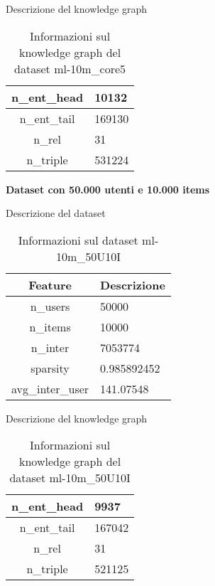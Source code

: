 \noindent Descrizione del knowledge graph
\begin{table}[H]
    \centering
    \footnotesize
    \begin{tabularx}{\textwidth}{|c|X|}
        \hline
        n\_ent\_head & 10132 \\
        \hline
        n\_ent\_tail & 169130 \\
        \hline
        n\_rel & 31 \\
        \hline
        n\_triple & 531224 \\
        \hline
    \end{tabularx}
    \caption{Informazioni sul knowledge graph del dataset ml-10m\_core5}
    \label{tab:dataset_info}
\end{table}



\noindent\textbf{Dataset con 50.000 utenti e 10.000 items}

\noindent Descrizione del dataset
\begin{table}[H]
    \centering
    \footnotesize
    \begin{tabularx}{\textwidth}{|c|X|}
        \hline
        \textbf{Feature} & \textbf{Descrizione} \\
        \hline
        n\_users & 50000 \\
        \hline
        n\_items & 10000 \\
        \hline
        n\_inter & 7053774 \\
        \hline
        sparsity & 0.985892452 \\
        \hline
        avg\_inter\_user & 141.07548 \\
        \hline
    \end{tabularx}
    \caption{Informazioni sul dataset ml-10m\_50U10I}
    \label{tab:dataset_info}
\end{table}


\noindent Descrizione del knowledge graph
\begin{table}[H]
    \centering
    \footnotesize
    \begin{tabularx}{\textwidth}{|c|X|}
        \hline
        n\_ent\_head & 9937 \\
        \hline
        n\_ent\_tail & 167042 \\
        \hline
        n\_rel & 31 \\
        \hline
        n\_triple & 521125 \\
        \hline
    \end{tabularx}
    \caption{Informazioni sul knowledge graph del dataset ml-10m\_50U10I}
    \label{tab:dataset_info}
\end{table}




